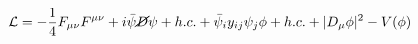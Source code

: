 \documentclass[varwidth]{standalone}
\begin{document}
$$
\mathcal{L} = - \frac{1}{4} F_{\mu \nu} F^{\mu \nu} + i \bar{\psi} \cancel{D} \psi + h.c. + \bar{\psi}_i y_{ij} \psi_j \phi + h.c. + |D_\mu \phi|^2 - V(\phi)
$$
\end{document}
